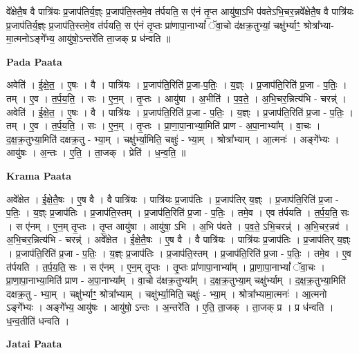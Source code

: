 \documentclass[17pt]{extarticle}
\begin{document}
वे᳚क्षेतै॒ष वै पात्रि॑यः प्र॒जाप॑तिर्य॒ज्ञ्ः प्र॒जाप॑ति॒स्तमे॒व त॑र्पयति॒ स ए॑नं तृ॒प्त आयु॑षा॒ऽभि प॑वतेऽभि॒चर॒न्नवे᳚क्षेतै॒ष वै पात्रि॑यः प्र॒जाप॑तिर्य॒ज्ञ्ः प्र॒जाप॑ति॒स्तमे॒व त॑र्पयति॒ स ए॑नं तृ॒प्तः प्रा॑णापा॒नाभ्यां᳚ ॅवा॒चो द॑क्षक्र॒तुभ्यां॒ चक्षु॑र्भ्याꣳ॒॒ श्रोत्रा᳚भ्या-मा॒त्मनोऽङ्गे᳚भ्य॒ आयु॑षो॒ऽन्तरे॑ति ता॒जक् प्र ध॑न्वति ॥ \newline

\textbf{Pada Paata} \newline

अवेति॑ । ई॒क्षे॒त॒ । ए॒षः । वै । पात्रि॑यः । प्र॒जाप॑ति॒रिति॑ प्र॒जा-प॒तिः॒ । य॒ज्ञ्ः । प्र॒जाप॑ति॒रिति॑ प्र॒जा - प॒तिः॒ । तम् । ए॒व । त॒र्प॒य॒ति॒ । सः । ए॒न॒म् । तृ॒प्तः । आयु॑षा । अ॒भीति॑ । प॒व॒ते॒ । अ॒भि॒चर॒न्नित्य॑भि - चरन्न्॑ । अवेति॑ । ई॒क्षे॒त॒ । ए॒षः । वै । पात्रि॑यः । प्र॒जाप॑ति॒रिति॑ प्र॒जा - प॒तिः॒ । य॒ज्ञ्ः । प्र॒जाप॑ति॒रिति॑ प्र॒जा - प॒तिः॒ । तम् । ए॒व । त॒र्प॒य॒ति॒ । सः । ए॒न॒म् । तृ॒प्तः । प्रा॒णा॒पा॒नाभ्या॒मिति॑ प्राण - अ॒पा॒नाभ्या᳚म् । वा॒चः । द॒क्ष॒क्र॒तुभ्या॒मिति॑ दक्षक्र॒तु - भ्या॒म् । चक्षु॑र्भ्या॒मिति॒ चक्षुः॑ - भ्या॒म् । श्रोत्रा᳚भ्याम् । आ॒त्मनः॑ । अङ्गे᳚भ्यः । आयु॑षः । अ॒न्तः । ए॒ति॒ । ता॒जक् । प्रेति॑ । ध॒न्व॒ति॒ ॥  \newline


\textbf{Krama Paata} \newline

अवे᳚क्षेत । ई॒क्षे॒तै॒षः । ए॒ष वै । वै पात्रि॑यः । पात्रि॑यः प्र॒जाप॑तिः । प्र॒जाप॑तिर् य॒ज्ञ्ः । प्र॒जाप॑ति॒रिति॑ प्र॒जा - प॒तिः॒ । य॒ज्ञ्ः प्र॒जाप॑तिः । प्र॒जाप॑ति॒स्तम् । प्र॒जाप॑ति॒रिति॑ प्र॒जा - प॒तिः॒ । तमे॒व । एव त॑र्पयति । त॒र्प॒य॒ति॒ सः । स ए॑नम् । ए॒न॒म् तृ॒प्तः । तृ॒प्त आयु॑षा । आयु॑षा॒ ऽभि । अ॒भि प॑वते । प॒व॒ते॒ ऽभि॒चरन्न्॑ । अ॒भि॒चर॒न्नव॑ । अ॒भि॒चर॒न्नित्य॑भि - चरन्न्॑ । अवे᳚क्षेत । ई॒क्षे॒तै॒षः । ए॒ष वै । वै पात्रि॑यः । पात्रि॑यः प्र॒जाप॑तिः । प्र॒जाप॑तिर् य॒ज्ञ्ः । प्र॒जाप॑ति॒रिति॑ प्र॒जा - प॒तिः॒ । य॒ज्ञ्ः प्र॒जाप॑तिः । प्र॒जाप॑ति॒स्तम् । प्र॒जाप॑ति॒रिति॑ प्र॒जा - प॒तिः॒ । तमे॒व । ए॒व त॑र्पयति । त॒र्प॒य॒ति॒ सः । स ए॑नम् । ए॒न॒म् तृ॒प्तः । तृ॒प्तः प्रा॑णापा॒नाभ्या᳚म् । प्रा॒णा॒पा॒नाभ्यां᳚ ॅवा॒चः । प्रा॒णा॒पा॒नाभ्या॒मिति॑ प्राण - अ॒पा॒नाभ्या᳚म् । वा॒चो द॑क्षक्र॒तुभ्या᳚म् । द॒क्ष॒क्र॒तुभ्या॒म् चक्षु॑र्भ्याम् । द॒क्ष॒क्र॒तुभ्या॒मिति॑ दक्षक्र॒तु - भ्या॒म् । चक्षु॑र्भ्याꣳ॒॒ श्रोत्रा᳚भ्याम् । चक्षु॑र्भ्या॒मिति॒ चक्षुः॑ - भ्या॒म् । श्रोत्रा᳚भ्यामा॒त्मनः॑ । आ॒त्मनो ऽङ्गे᳚भ्यः । अङ्गे᳚भ्य॒ आयु॑षः । आयु॑षो॒ ऽन्तः । अ॒न्तरे॑ति । ए॒ति॒ ता॒जक् । ता॒जक् प्र । प्र ध॑न्वति । ध॒न्व॒तीति॑ धन्वति । \newline

\textbf{Jatai Paata} \newline
\end{document}
